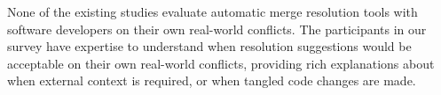 None of the existing studies evaluate automatic merge resolution tools with software developers on their own real-world conflicts. The participants in our survey have expertise to understand when \thistool{} resolution suggestions would be acceptable on their own real-world conflicts, providing rich explanations about when external context is required, or when tangled code changes are made.








